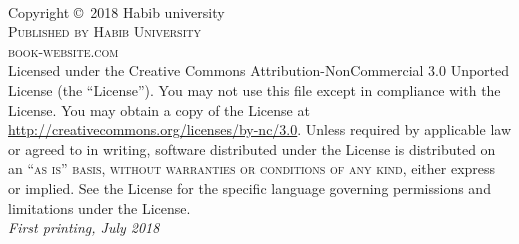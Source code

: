\documentclass[11pt,fleqn]{book} %
\begin{document}

\begingroup
\thispagestyle{empty}
\vfill
\endgroup


\newpage
~\vfill
\thispagestyle{empty}

\noindent Copyright \copyright\ 2018 Habib university\\ %

\noindent \textsc{Published by Habib University}\\ %

\noindent \textsc{book-website.com}\\ %

\noindent Licensed under the Creative Commons Attribution-NonCommercial 3.0 Unported License (the ``License''). You may not use this file except in compliance with the License. You may obtain a copy of the License at \url{http://creativecommons.org/licenses/by-nc/3.0}. Unless required by applicable law or agreed to in writing, software distributed under the License is distributed on an \textsc{``as is'' basis, without warranties or conditions of any kind}, either express or implied. See the License for the specific language governing permissions and limitations under the License.\\ %

\noindent \textit{First printing, July 2018} %

\end{document}
